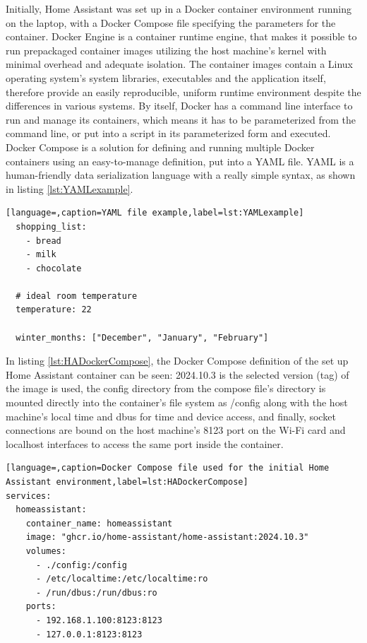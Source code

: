 Initially, Home Assistant was set up in a Docker container environment running on the laptop, with a Docker Compose file specifying the parameters for the container. Docker Engine is a container runtime engine, that makes it possible to run prepackaged container images utilizing the host machine's kernel with minimal overhead and adequate isolation. \cite{DockerContainer} The container images contain a Linux operating system's system libraries, executables and the application itself, therefore provide an easily reproducible, uniform runtime environment despite the differences in various systems. By itself, Docker has a command line interface to run and manage its containers, which means it has to be parameterized from the command line, or put into a script in its parameterized form and executed. Docker Compose is a solution for defining and running multiple Docker containers using an easy-to-manage definition, put into a YAML file. \cite{DockerCompose} YAML is a human-friendly data serialization language with a really simple syntax, as shown in listing \ref{lst:YAMLexample}. \cite{YAMLHomepage}

\begin{lstlisting}[language=,caption=YAML file example,label=lst:YAMLexample]
  shopping_list:
    - bread
    - milk
    - chocolate

  # ideal room temperature
  temperature: 22

  winter_months: ["December", "January", "February"]
\end{lstlisting}

In listing \ref{lst:HADockerCompose}, the Docker Compose definition of the set up Home Assistant container can be seen: 2024.10.3 is the selected version (tag) of the image is used, the config directory from the compose file's directory is mounted directly into the container's file system as /config along with the host machine's local time and dbus for time and device access, and finally, socket connections are bound on the host machine's 8123 port on the Wi-Fi card and localhost interfaces to access the same port inside the container.\break

\begin{lstlisting}[language=,caption=Docker Compose file used for the initial Home Assistant environment,label=lst:HADockerCompose]
services:
  homeassistant:
    container_name: homeassistant
    image: "ghcr.io/home-assistant/home-assistant:2024.10.3"
    volumes:
      - ./config:/config
      - /etc/localtime:/etc/localtime:ro
      - /run/dbus:/run/dbus:ro
    ports:
      - 192.168.1.100:8123:8123
      - 127.0.0.1:8123:8123
\end{lstlisting}

